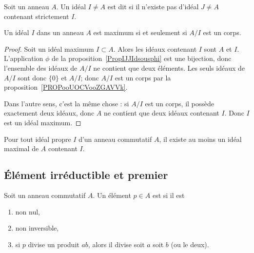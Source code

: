 \begin{definition}      \label{DEFIdealMax}
	Soit un anneau \( A\). Un idéal \( I\neq A\) est dit  si il n'existe pas d'idéal \( J\neq A\) contenant strictement \( I\).
\end{definition}

\begin{proposition}     \label{PROPooSHHWooCyZPPw}
	Un idéal \( I\) dans un anneau \( A \) est maximum si et seulement si \( A/I\) est un corps.
\end{proposition}

\begin{proof}
	Soit un idéal maximum \( I\subset A\). Alors les idéaux contenant \( I\) sont \( A\) et \( I\). L'application \( \phi\) de la proposition~\ref{PropIJJIdsousphi} est une bijection, donc l'ensemble des idéaux de \( A/I\) ne contient que deux éléments. Les seuls idéaux de \( A/I\) sont donc \( \{ 0 \}\) et \( A/I\); donc \( A/I\) est un corps par la proposition~\ref{PROPooUOCVooZGAVVk}.

	Dans l'autre sens, c'est la même chose : si \( A/I\) est un corps, il possède exactement deux idéaux, donc \( A\) ne contient que deux idéaux contenant \( I\). Donc \( I\) est un idéal maximum.
\end{proof}

\begin{theorem}      \label{THOooFWYLooOofaPa}
	Pour tout idéal propre \( I\) d'un anneau commutatif \( A\), il existe au moins un idéal maximal de \( A\) contenant \( I\).
\end{theorem}


\subsection{Élément irréductible et premier}

\begin{definition}       \label{DEFooZCRQooWXRalw}
	Soit un anneau commutatif \( A\). Un élément \( p\in A\) est  si il est
	\begin{enumerate}
		\item
		      non nul,
		\item
		      non inversible,
		\item       \label{ITEMooPMTTooCVHPIm}
		      si \( p\) divise un produit \( ab\), alors il divise soit \( a\) soit \( b\) (ou le deux).
	\end{enumerate}
\end{definition}

